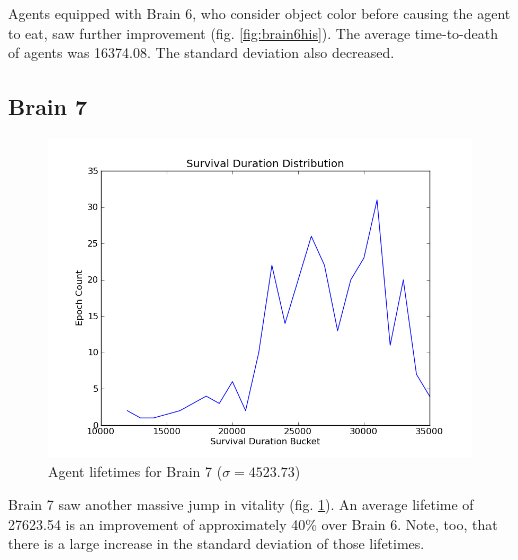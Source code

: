 Agents equipped with Brain 6, who consider object color before causing the 
agent to eat, saw further improvement (fig. \ref{fig:brain6his}). The average 
time-to-death of agents was 16374.08. The standard deviation also decreased.


\subsection{Brain 7}
\begin{figure}
\begin{center}
  \includegraphics[scale=.65]{plots/brain7hist.png}
  \caption{Agent lifetimes for Brain 7 ($\sigma = 4523.73$)}
  \label{fig:brain7his}
\end{center}
\end{figure}

Brain 7 saw another massive jump in vitality 
(fig. \ref{fig:brain7his}). An average lifetime of 27623.54 is an improvement
of approximately 40\% over Brain 6. Note, too, that there is a large increase 
in the standard deviation of those lifetimes.


